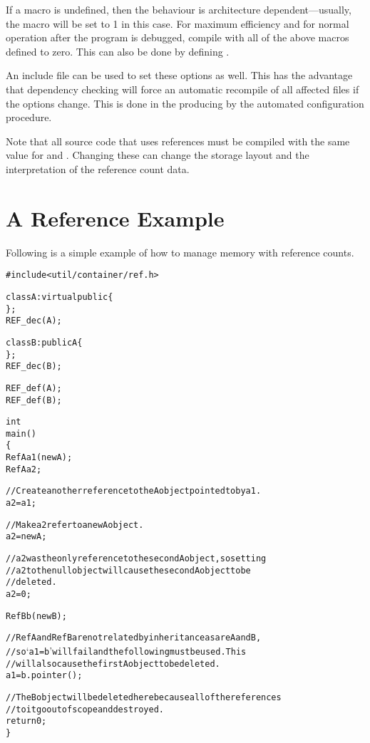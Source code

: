 If a macro is undefined, then the behaviour is architecture
dependent---usually, the macro will be set to 1 in this case.
For maximum efficiency and for normal operation after the program is
debugged, compile with all of the above macros defined to zero.
This can also be done by defining .

  An include file can be used to set these options as well.  This has
the advantage that dependency checking will force an automatic
recompile of all affected files if the options change.  This is done
in the  producing by the automated configuration
procedure.

  Note that all source code that uses references must be compiled with
the same value for  and .
Changing these can change the storage layout and the interpretation of
the reference count data.

\section{A Reference Example}

Following is a simple example of how to manage memory with reference
counts.

\begin{alltt}
#include <util/container/ref.h>

class A: virtual public  \{
\};
REF_dec(A);

class B: public A \{
\};
REF_dec(B);

REF_def(A);
REF_def(B);

int
main()
\{
  RefA a1(new A);
  RefA a2;

  // Create another reference to the A object pointed to by a1.
  a2 = a1;

  // Make a2 refer to a new A object.
  a2 = new A;

  // a2 was the only reference to the second A object, so setting
  // a2 to the null object will cause the second A object to be
  // deleted.
  a2 = 0;

  RefB b(new B);

  // RefA and RefB are not related by inheritance as are A and B,
  // so `a1 = b' will fail and the following must be used.  This
  // will also cause the first A object to be deleted.
  a1 = b.pointer();

  // The B object will be deleted here because all of the references
  // to it go out of scope and destroyed.
  return 0;
\}
\end{alltt}
